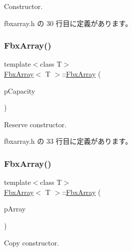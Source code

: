 Constructor. 



 fbxarray.\+h の 30 行目に定義があります。

\mbox{\label{class_fbx_array_ac3a4674fa57256ad8be76d3d815cd5be}} 
\subsubsection{\texorpdfstring{Fbx\+Array()}{FbxArray()}\hspace{0.1cm}{\footnotesize\ttfamily [2/3]}}
{\footnotesize\ttfamily template$<$class T$>$ \\
\hyperlink{class_fbx_array}{Fbx\+Array}$<$ T $>$\+::\hyperlink{class_fbx_array}{Fbx\+Array} (\begin{DoxyParamCaption}\item[{const int}]{p\+Capacity }\end{DoxyParamCaption})\hspace{0.3cm}{\ttfamily [inline]}}



Reserve constructor. 



 fbxarray.\+h の 33 行目に定義があります。

\mbox{\label{class_fbx_array_a2ec010767ac567804d4c4174048133b3}} 
\subsubsection{\texorpdfstring{Fbx\+Array()}{FbxArray()}\hspace{0.1cm}{\footnotesize\ttfamily [3/3]}}
{\footnotesize\ttfamily template$<$class T$>$ \\
\hyperlink{class_fbx_array}{Fbx\+Array}$<$ T $>$\+::\hyperlink{class_fbx_array}{Fbx\+Array} (\begin{DoxyParamCaption}\item[{const \hyperlink{class_fbx_array}{Fbx\+Array}$<$ T $>$ \&}]{p\+Array }\end{DoxyParamCaption})\hspace{0.3cm}{\ttfamily [inline]}}



Copy constructor. 



